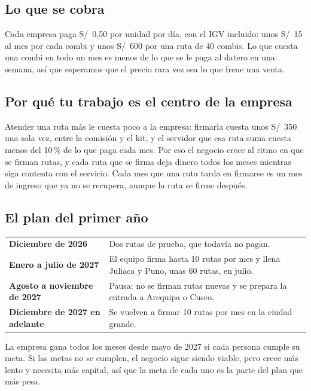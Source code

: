 \documentclass[a4paper]{article}
\begin{document}
\subsection{Lo que se cobra}

Cada empresa paga S/~0,50 por unidad por día, con el IGV incluido: unos S/~15 al mes por cada combi y unos S/~600 por una ruta de 40 combis. Lo que cuesta una combi en todo un mes es menos de lo que se le paga al datero en una semana, así que esperamos que el precio rara vez sea lo que frene una venta.

\subsection{Por qué tu trabajo es el centro de la empresa}

Atender una ruta más le cuesta poco a la empresa: firmarla cuesta unos S/~350 una sola vez, entre la comisión y el kit, y el servidor que esa ruta suma cuesta menos del 10\,\% de lo que paga cada mes. Por eso el negocio crece al ritmo en que se firman rutas, y cada ruta que se firma deja dinero todos los meses mientras siga contenta con el servicio. Cada mes que una ruta tarda en firmarse es un mes de ingreso que ya no se recupera, aunque la ruta se firme después.

\subsection{El plan del primer año}

\begin{center}
\begin{tabularx}{\linewidth}{@{}>{\bfseries}p{3.6cm}X@{}}
\toprule
Diciembre de 2026 & Dos rutas de prueba, que todavía no pagan.\\
Enero a julio de 2027 & El equipo firma hasta 10 rutas por mes y llena Juliaca y Puno, unas 60 rutas, en julio.\\
Agosto a noviembre de 2027 & Pausa: no se firman rutas nuevas y se prepara la entrada a Arequipa o Cusco.\\
Diciembre de 2027 en adelante & Se vuelven a firmar 10 rutas por mes en la ciudad grande.\\
\bottomrule
\end{tabularx}
\end{center}

La empresa gana todos los meses desde mayo de 2027 si cada persona cumple su meta. Si las metas no se cumplen, el negocio sigue siendo viable, pero crece más lento y necesita más capital, así que la meta de cada uno es la parte del plan que más pesa.
\end{document}
